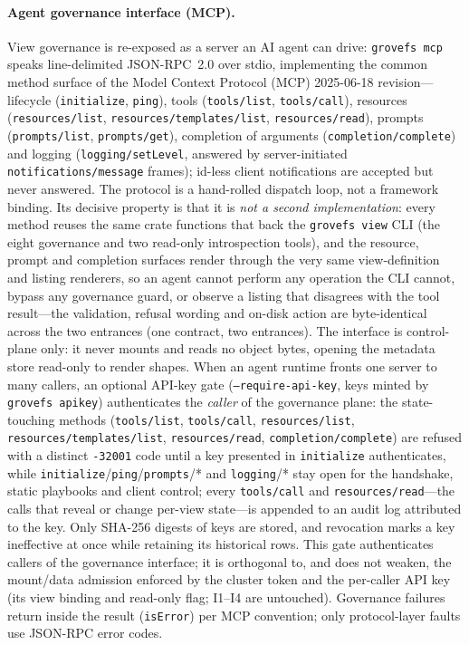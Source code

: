 \documentclass[numberedsection,acmtos]{acmart}
\begin{document}
\paragraph{Agent governance interface (MCP).} View governance is re-exposed
as a server an AI agent can drive: \texttt{grovefs mcp} speaks line-delimited
JSON-RPC~2.0 over stdio, implementing the common method surface of the
Model Context Protocol (MCP) 2025-06-18 revision---lifecycle
(\texttt{initialize}, \texttt{ping}), tools (\texttt{tools/}\allowbreak\texttt{list},
\texttt{tools/}\allowbreak\texttt{call}), resources (\texttt{resources/list},
\texttt{resources/templates/}\allowbreak\texttt{list}, \texttt{resources/read}),
prompts (\texttt{prompts/}\allowbreak\texttt{list}, \texttt{prompts/}\allowbreak\texttt{get}),
completion of arguments (\texttt{completion/}\allowbreak\texttt{complete}) and logging
(\texttt{logging/}\allowbreak\texttt{setLevel}, answered by server-initiated
\texttt{notifications/}\allowbreak\texttt{message} frames); id-less client
notifications are accepted but never answered. The protocol is a hand-rolled dispatch loop, not a
framework binding. Its decisive property is that it is \emph{not a second
implementation}: every method reuses the same crate functions that back the
\texttt{grovefs view} CLI (the eight governance and two read-only introspection
tools), and the resource, prompt and completion surfaces render through the very
same view-definition and listing renderers, so an agent cannot perform any
operation the CLI cannot, bypass any governance guard, or observe a listing that
disagrees with the tool result---the validation, refusal wording and on-disk
action are byte-identical across the two entrances (one contract, two
entrances). The interface is control-plane only: it never mounts and reads no
object bytes, opening the metadata store read-only to render shapes. When an
agent runtime fronts one server to many callers, an optional API-key gate
(\texttt{--require-api-key}, keys minted by \texttt{grovefs apikey}) authenticates
the \emph{caller} of the governance plane: the state-touching methods
(\texttt{tools/list}, \texttt{tools/call}, \texttt{resources/list},
\texttt{resources/templates/list}, \texttt{resources/read},
\texttt{completion/complete}) are refused with a distinct
\texttt{-32001} code until a key presented in \texttt{initialize}
authenticates, while \texttt{initialize}/\texttt{ping}/\texttt{prompts}/* and
\texttt{logging}/* stay open for the handshake, static playbooks and client
control; every \texttt{tools/call} and \texttt{resources/read}---the calls that
reveal or change per-view state---is appended to an audit log attributed to the
key. Only SHA-256 digests of keys are stored, and revocation marks a key
ineffective at once while retaining its historical rows. This gate authenticates
callers of the governance interface; it is orthogonal to, and does not weaken,
the mount/data admission enforced by the cluster token and the per-caller API
key (its view binding and read-only flag; I1--I4 are untouched). Governance failures return inside the result (\texttt{isError}) per
MCP convention; only protocol-layer faults use JSON-RPC error codes.
\end{document}
